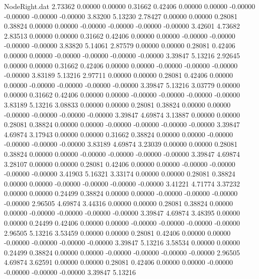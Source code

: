 \begin{filecontents}{NodeRight.dat}
   2.73362    0.00000    0.00000     0.31662    0.42406    0.00000    0.00000   -0.00000   -0.00000   -0.00000   -0.00000    3.83200    5.13230
   2.78427    0.00000    0.00000     0.28081    0.38824    0.00000    0.00000   -0.00000   -0.00000   -0.00000   -0.00000    3.42601    4.73682
   2.83513    0.00000    0.00000     0.31662    0.42406    0.00000    0.00000   -0.00000   -0.00000   -0.00000   -0.00000    3.83820    5.14061
   2.87579    0.00000    0.00000     0.28081    0.42406    0.00000    0.00000   -0.00000   -0.00000   -0.00000   -0.00000    3.39847    5.13216
   2.92645    0.00000    0.00000     0.31662    0.42406    0.00000    0.00000   -0.00000   -0.00000   -0.00000   -0.00000    3.83189    5.13216
   2.97711    0.00000    0.00000     0.28081    0.42406    0.00000    0.00000   -0.00000   -0.00000   -0.00000   -0.00000    3.39847    5.13216
   3.03779    0.00000    0.00000     0.31662    0.42406    0.00000    0.00000   -0.00000   -0.00000   -0.00000   -0.00000    3.83189    5.13216
   3.08833    0.00000    0.00000     0.28081    0.38824    0.00000    0.00000   -0.00000   -0.00000   -0.00000   -0.00000    3.39847    4.69874
   3.13887    0.00000    0.00000     0.28081    0.38824    0.00000    0.00000   -0.00000   -0.00000   -0.00000   -0.00000    3.39847    4.69874
   3.17943    0.00000    0.00000     0.31662    0.38824    0.00000    0.00000   -0.00000   -0.00000   -0.00000   -0.00000    3.83189    4.69874
   3.23039    0.00000    0.00000     0.28081    0.38824    0.00000    0.00000   -0.00000   -0.00000   -0.00000   -0.00000    3.39847    4.69874
   3.28107    0.00000    0.00000     0.28081    0.42406    0.00000    0.00000   -0.00000   -0.00000   -0.00000   -0.00000    3.41903    5.16321
   3.33174    0.00000    0.00000     0.28081    0.38824    0.00000    0.00000   -0.00000   -0.00000   -0.00000   -0.00000    3.41221    4.71774
   3.37232    0.00000    0.00000     0.24499    0.38824    0.00000    0.00000   -0.00000   -0.00000   -0.00000   -0.00000    2.96505    4.69874
   3.44316    0.00000    0.00000     0.28081    0.38824    0.00000    0.00000   -0.00000   -0.00000   -0.00000   -0.00000    3.39847    4.69874
   3.48395    0.00000    0.00000     0.24499    0.42406    0.00000    0.00000   -0.00000   -0.00000   -0.00000   -0.00000    2.96505    5.13216
   3.53459    0.00000    0.00000     0.28081    0.42406    0.00000    0.00000   -0.00000   -0.00000   -0.00000   -0.00000    3.39847    5.13216
   3.58534    0.00000    0.00000     0.24499    0.38824    0.00000    0.00000   -0.00000   -0.00000   -0.00000   -0.00000    2.96505    4.69874
   3.62591    0.00000    0.00000     0.28081    0.42406    0.00000    0.00000   -0.00000   -0.00000   -0.00000   -0.00000    3.39847    5.13216

\end{filecontents}
